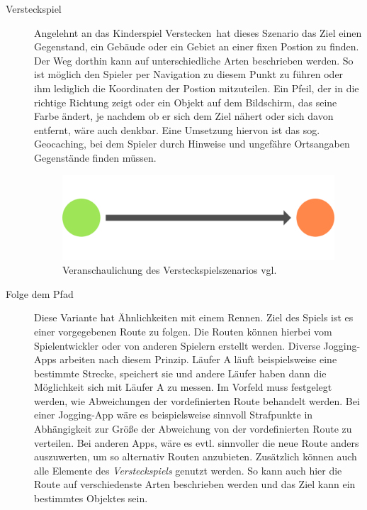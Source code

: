 \begin{description} 
\item[Versteckspiel] 

Angelehnt an das Kinderspiel \glqq Verstecken\grqq\, hat dieses Szenario das Ziel einen Gegenstand, ein Gebäude oder ein Gebiet an einer fixen Postion zu finden. Der Weg dorthin kann auf unterschiedliche Arten beschrieben werden. So ist möglich den Spieler per Navigation zu diesem Punkt zu führen oder ihm lediglich die Koordinaten der Postion mitzuteilen. Ein Pfeil, der in die richtige Richtung zeigt oder ein Objekt auf dem Bildschirm, das seine Farbe ändert, je nachdem ob er sich dem Ziel nähert oder sich davon entfernt, wäre auch denkbar. Eine Umsetzung hiervon ist das sog. Geocaching, bei dem Spieler durch Hinweise und ungefähre Ortsangaben Gegenstände finden müssen. \cite[S. 1 ff.]{Dyer:2010wt} \cite[S. 2 f.]{Lehmann:2012va}


\begin{figure}[H]
    \centering
    \includegraphics[width=.8\textwidth]{files/lbgArten/searchAndFind}
    \caption{Veranschaulichung des Versteckspielszenarios vgl. \cite[S. 2]{Lehmann:2012va}}
    \label{szenA}
\end{figure}

\item[Folge dem Pfad]

Diese Variante hat Ähnlichkeiten mit einem Rennen. Ziel des Spiels ist es einer vorgegebenen Route zu folgen. Die Routen können hierbei vom Spielentwickler oder von anderen Spielern erstellt werden. Diverse Jogging-Apps arbeiten nach diesem Prinzip. Läufer A läuft beispielsweise eine bestimmte Strecke, speichert sie und andere Läufer haben dann die Möglichkeit sich mit Läufer A zu messen. Im Vorfeld muss festgelegt werden, wie Abweichungen der vordefinierten Route behandelt werden. Bei einer Jogging-App wäre es beispielsweise sinnvoll Strafpunkte in Abhängigkeit zur Größe der Abweichung von der vordefinierten Route zu verteilen. Bei anderen Apps, wäre es evtl. sinnvoller die neue Route anders auszuwerten, um so alternativ Routen anzubieten. Zusätzlich können auch alle Elemente des \textit{Versteckspiels} genutzt werden. So kann auch hier die Route auf verschiedenste Arten beschrieben werden und das Ziel kann ein bestimmtes Objektes sein. 



\end{description}
